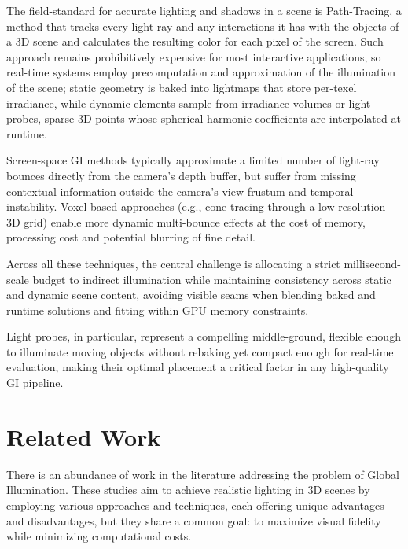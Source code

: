 The field-standard for accurate lighting and shadows in a scene is Path-Tracing, a method that tracks every light ray and any interactions it has with the objects of a 3D scene and calculates the resulting color for each pixel of the screen. Such approach remains prohibitively expensive for most interactive applications, so real-time systems employ precomputation and approximation of the illumination of the scene; static geometry is baked into lightmaps that store per-texel irradiance, while dynamic elements sample from irradiance volumes or light probes, sparse 3D points whose spherical-harmonic coefficients are interpolated at runtime. 

Screen-space GI methods typically approximate a limited number of light-ray bounces directly from the camera's depth buffer, but suffer from missing contextual information outside the camera's view frustum and temporal instability. Voxel-based approaches (e.g., cone-tracing through a low resolution 3D grid) %
enable more dynamic multi-bounce effects at the cost of memory, processing cost and potential blurring of fine detail. 

Across all these techniques, the central challenge is allocating a strict millisecond-scale budget to indirect illumination while maintaining consistency across static and dynamic scene content, avoiding visible seams when blending baked and runtime solutions and fitting within GPU memory constraints. 

Light probes, in particular, represent a compelling middle-ground, flexible enough to illuminate moving objects without rebaking yet compact enough for real-time evaluation, making their optimal placement a critical factor in any high-quality GI pipeline.



\section{Related Work}
There is an abundance of work in the literature addressing the problem of Global Illumination. These studies aim to achieve realistic lighting in 3D scenes by employing various approaches and techniques, each offering unique advantages and disadvantages, but they share a common goal: to maximize visual fidelity while minimizing computational costs.

